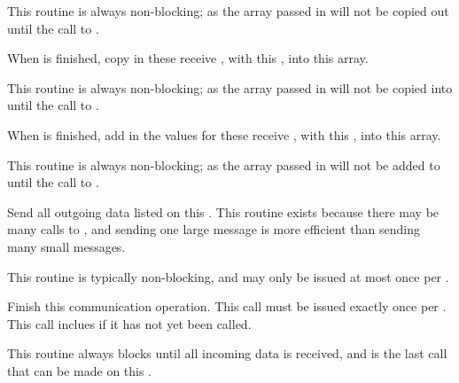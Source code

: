 This routine is always non-blocking; as the  array passed in
will not be copied out until the call to .



When  is finished, copy in these receive , with
this , into this  array.

This routine is always non-blocking; as the  array passed in
will not be copied into until the call to .



When  is finished, add in the values for these receive , 
with this , into this  array.

This routine is always non-blocking; as the  array passed in
will not be added to until the call to .



Send all outgoing data listed on this .  This routine exists because there may be many calls to , and sending one large message is more efficient than sending many small messages.

This routine is typically non-blocking, and may only be issued at most once per .



Finish this communication operation. This call must be issued exactly once per .  This call inclues  if it has not yet been called.

This routine always blocks until all incoming data is received, and is the last call that can be made on this .

